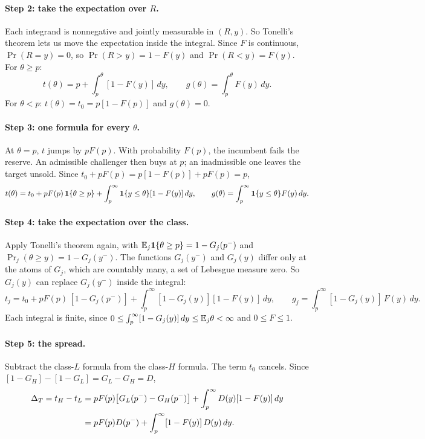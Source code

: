 \paragraph{Step 2: take the expectation over \(R\).} Each integrand is nonnegative and jointly measurable in
\((R,y)\). So Tonelli's theorem lets us move the expectation inside the integral. Since \(F\) is
continuous, \(\Pr(R=y)=0\), so \(\Pr(R>y)=1-F(y)\) and \(\Pr(R<y)=F(y)\). For \(\theta\ge p\):
\[
t(\theta)=p+\int_p^\theta[1-F(y)]\,dy,\qquad g(\theta)=\int_p^\theta F(y)\,dy.
\]
For \(\theta<p\): \(t(\theta)=t_0=p[1-F(p)]\) and \(g(\theta)=0\).

\paragraph{Step 3: one formula for every \(\theta\).} At \(\theta=p\), \(t\) jumps by \(pF(p)\).
With probability \(F(p)\), the incumbent fails the reserve.
An admissible challenger then buys at \(p\); an inadmissible one leaves the target unsold. Since \(t_0+pF(p)=p[1-F(p)]+pF(p)=p\),
\[
t(\theta)=t_0+pF(p)\,\mathbf{1}\{\theta\ge p\}+\int_p^\infty\mathbf{1}\{y\le\theta\}[1-F(y)]\,dy,\qquad
g(\theta)=\int_p^\infty\mathbf{1}\{y\le\theta\}F(y)\,dy.
\]

\paragraph{Step 4: take the expectation over the class.} Apply Tonelli's theorem again, with
\(\mathbb{E}_j\mathbf{1}\{\theta\ge p\}=1-G_j(p^-)\) and \(\Pr_j(\theta\ge y)=1-G_j(y^-)\). The functions \(G_j(y^-)\) and
\(G_j(y)\) differ only at the atoms of \(G_j\), which are countably many, a set of Lebesgue measure zero.
So \(G_j(y)\) can replace \(G_j(y^-)\) inside the integral:
\[
t_j=t_0+pF(p)\,[1-G_j(p^-)]+\int_p^\infty[1-G_j(y)][1-F(y)]\,dy,\qquad
g_j=\int_p^\infty[1-G_j(y)]\,F(y)\,dy.
\]
Each integral is finite, since \(0\le\int_p^\infty[1-G_j(y)]\,dy\le\mathbb{E}_j\theta<\infty\) and \(0\le F\le1\).

\paragraph{Step 5: the spread.} Subtract the class-\(L\) formula from the class-\(H\) formula. The term
\(t_0\) cancels. Since \([1-G_H]-[1-G_L]=G_L-G_H=D\),
\begin{align*}
\Delta_T=t_H-t_L&=pF(p)\bigl[G_L(p^-)-G_H(p^-)\bigr]+\int_p^\infty D(y)[1-F(y)]\,dy\\
&=pF(p)D(p^-)+\int_p^\infty[1-F(y)]\,D(y)\,dy .
\end{align*}

